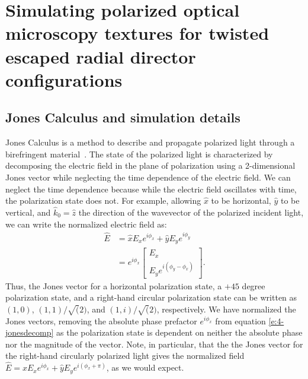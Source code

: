 \section{Simulating polarized optical microscopy textures for twisted escaped radial director configurations}
\subsection{Jones Calculus and simulation details}
Jones Calculus is a method to describe and propagate polarized light through a birefringent material~\cite{RN232}.
The state of the polarized light is characterized by decomposing the electric field in the plane of polarization using a 2-dimensional Jones vector while neglecting the time dependence of the electric field.
We can neglect the time dependence because while the electric field oscillates with time, the polarization state does not.
For example, allowing $\hat{x}$ to be horizontal, $\hat{y}$ to be vertical, and $\hat{k}_0 = \hat{z}$ the direction of the wavevector of the polarized incident light, we can write the normalized electric field as:
\begin{align}
\hat{E} &=  \hat{x}E_x e^{i \phi _x} + \hat{y} E_y e^{i \phi _y}\\  &= e^{i \phi _x} \left[ \begin{array}{c} E_x \\E_y e^{i(\phi _y - \phi _x)}      \end{array} \right]. \label{e:4-jonesdecomp}
\end{align}
Thus, the Jones vector for a horizontal polarization state, a $+45$ degree polarization state, and a right-hand circular polarization state can be written as $(1,0)$, $(1,1)/\sqrt(2)$, and $(1,i)/\sqrt(2)$, respectively.
We have normalized the Jones vectors, removing the absolute phase prefactor $e^{i \phi _x}$ from equation \ref{e:4-jonesdecomp} as the polarization state is dependent on neither the absolute phase nor the magnitude of the vector.
Note, in particular, that the the Jones vector for the right-hand circularly polarized light gives the normalized field $\hat{E} = \hat{x}E_x e^{i \phi _x} + \hat{y} E_y e^{i( \phi _x+\pi)}$, as we would expect.

